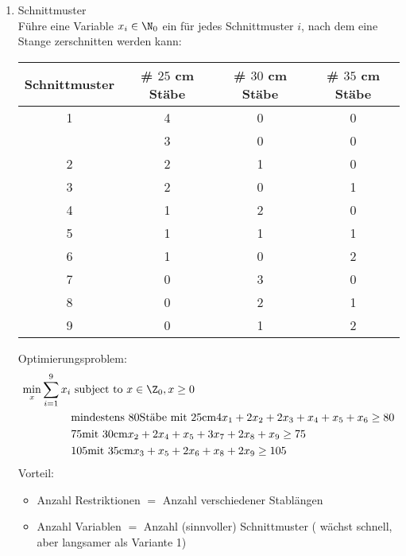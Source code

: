 \begin{beispiel}
\begin{enumerate}
 		\item Schnittmuster\\
     	Führe eine Variable $x_{i} \in \N_{0}$ ein für jedes Schnittmuster $i$, nach dem eine Stange zerschnitten werden kann: 
		\begin{table}[H]
			\centering
			\begin{tabular}{c|c|c|c}
      		Schnittmuster & # $25$ cm Stäbe & # $30$ cm Stäbe & # $35$ cm Stäbe\\
      		\hline
      		1 & 4 & 0 & 0\\
        	  & 3 & 0 & 0\\
      		2 & 2 & 1 & 0\\
      		3 & 2 & 0 & 1\\
      		4 & 1 & 2 & 0\\
      		5 & 1 & 1 & 1\\
      		6 & 1 & 0 & 2\\
      		7 & 0 & 3 & 0\\
      		8 & 0 & 2 & 1\\
      		9 & 0 & 1 & 2\\
    		\end{tabular}
		\end{table}
		
         	Optimierungsproblem:
    	\begin{align*}
			\min_{x} \sum_{i=1}^{9} x_{i}& \text{ subject to } x \in \Z_{0}, x\geq 0         \\
										 & \text{mindestens } 80 \text{Stäbe mit }25\text{cm} 4x_{1} + 2x_{2} + 2x_{3} + x_{4} + x_{5} + x_{6} \geq 80\\
										 & 75\text{mit } 30 \text{cm} x_{2} + 2x_{4} + x_{5} + 3x_{7} + 2x_{8} + x_{9} \geq 75\\
										 & 105\text{mit } 35 \text{cm} x_{3} + x_{5} + 2x_{6} + x_{8} + 2x_{9} \geq 105\\
    	\end{align*}
		Vorteil: 
		\begin{itemize}
			\item Anzahl Restriktionen $=$ Anzahl verschiedener Stablängen
			\item Anzahl Variablen $=$ Anzahl (sinnvoller) Schnittmuster ( wächst schnell, aber langsamer als Variante 1)
		\end{itemize}
	 

\end{enumerate}
\end{beispiel}
